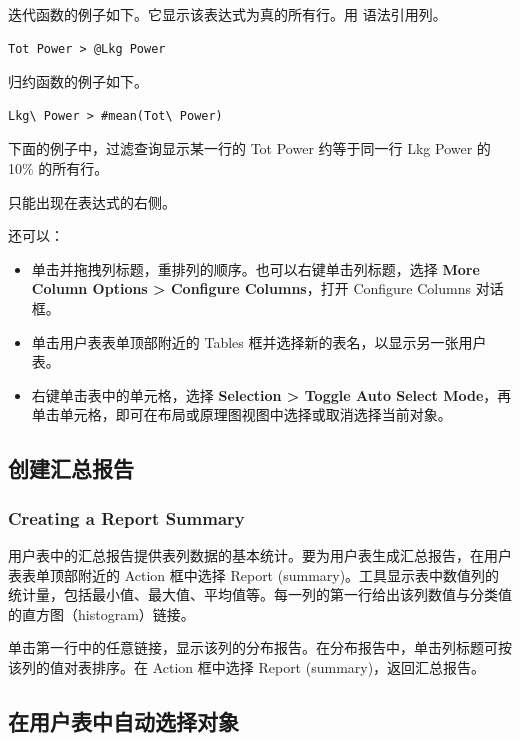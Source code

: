 迭代函数的例子如下。它显示该表达式为真的所有行。用  语法引用列。

\begin{lstlisting}[language={}]
Tot Power > @Lkg Power
\end{lstlisting}

归约函数的例子如下。

\begin{lstlisting}[language={}]
Lkg\ Power > #mean(Tot\ Power)
\end{lstlisting}

下面的例子中，过滤查询显示某一行的 Tot Power 约等于同一行 Lkg Power 的 10\% 的所有行。

\begin{noteBox}
 只能出现在表达式的右侧。
\end{noteBox}

还可以：
\begin{itemize}
  \item 单击并拖拽列标题，重排列的顺序。也可以右键单击列标题，选择 \textbf{More Column Options > Configure Columns}，打开 Configure Columns 对话框。
  \item 单击用户表表单顶部附近的 Tables 框并选择新的表名，以显示另一张用户表。
  \item 右键单击表中的单元格，选择 \textbf{Selection > Toggle Auto Select Mode}，再单击单元格，即可在布局或原理图视图中选择或取消选择当前对象。
\end{itemize}

\subsection{创建汇总报告}
\subsubsection*{Creating a Report Summary}

用户表中的汇总报告提供表列数据的基本统计。要为用户表生成汇总报告，在用户表表单顶部附近的 Action 框中选择 Report (summary)。工具显示表中数值列的统计量，包括最小值、最大值、平均值等。每一列的第一行给出该列数值与分类值的直方图（histogram）链接。

单击第一行中的任意链接，显示该列的分布报告。在分布报告中，单击列标题可按该列的值对表排序。在 Action 框中选择 Report (summary)，返回汇总报告。

\subsection{在用户表中自动选择对象}
